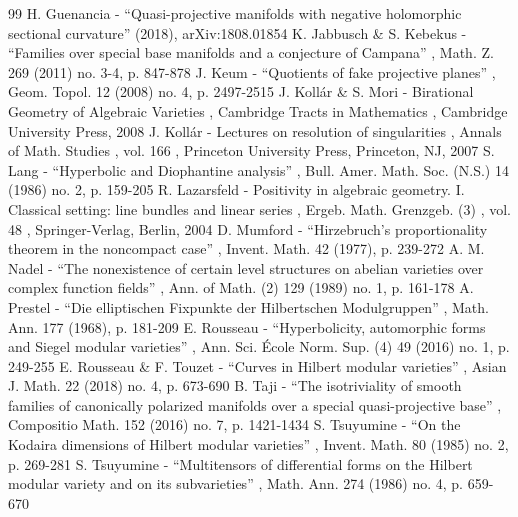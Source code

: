 \begin{thebibliography}{99}
 H. Guenancia - “Quasi-projective manifolds with negative holomorphic sectional curvature” (2018), arXiv:1808.01854
 K. Jabbusch \& S. Kebekus - “Families over special base manifolds and a conjecture of Campana” , Math. Z. 269 (2011) no. 3-4, p. 847-878
 J. Keum - “Quotients of fake projective planes” , Geom. Topol. 12 (2008) no. 4, p. 2497-2515
 J. Kollár \& S. Mori - Birational Geometry of Algebraic Varieties , Cambridge Tracts in Mathematics , Cambridge University Press, 2008
 J. Kollár - Lectures on resolution of singularities , Annals of Math. Studies , vol. 166 , Princeton University Press, Princeton, NJ, 2007
 S. Lang - “Hyperbolic and Diophantine analysis” , Bull. Amer. Math. Soc. (N.S.) 14 (1986) no. 2, p. 159-205
 R. Lazarsfeld - Positivity in algebraic geometry. I. Classical setting: line bundles and linear series , Ergeb. Math. Grenzgeb. (3) , vol. 48 , Springer-Verlag, Berlin, 2004
 D. Mumford - “Hirzebruch’s proportionality theorem in the noncompact case” , Invent. Math. 42 (1977), p. 239-272
 A. M. Nadel - “The nonexistence of certain level structures on abelian varieties over complex function fields” , Ann. of Math. (2) 129 (1989) no. 1, p. 161-178
 A. Prestel - “Die elliptischen Fixpunkte der Hilbertschen Modulgruppen” , Math. Ann. 177 (1968), p. 181-209
 E. Rousseau - “Hyperbolicity, automorphic forms and Siegel modular varieties” , Ann. Sci. École Norm. Sup. (4) 49 (2016) no. 1, p. 249-255
 E. Rousseau \& F. Touzet - “Curves in Hilbert modular varieties” , Asian J. Math. 22 (2018) no. 4, p. 673-690
 B. Taji - “The isotriviality of smooth families of canonically polarized manifolds over a special quasi-projective base” , Compositio Math. 152 (2016) no. 7, p. 1421-1434
 S. Tsuyumine - “On the Kodaira dimensions of Hilbert modular varieties” , Invent. Math. 80 (1985) no. 2, p. 269-281
 S. Tsuyumine - “Multitensors of differential forms on the Hilbert modular variety and on its subvarieties” , Math. Ann. 274 (1986) no. 4, p. 659-670
\end{thebibliography}
